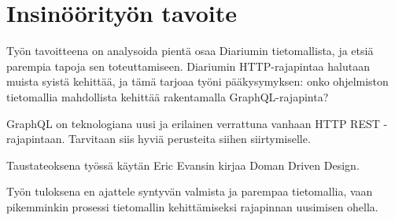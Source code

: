 \section{Insinöörityön tavoite}

Työn tavoitteena on analysoida pientä osaa Diariumin tietomallista, ja etsiä
parempia tapoja sen toteuttamiseen. Diariumin HTTP-rajapintaa halutaan muista
syistä kehittää, ja tämä tarjoaa työni pääkysymyksen: onko ohjelmiston
tietomallia mahdollista kehittää rakentamalla GraphQL-rajapinta?

GraphQL on teknologiana uusi ja erilainen verrattuna vanhaan HTTP REST
-rajapintaan. Tarvitaan siis hyviä perusteita siihen siirtymiselle.

Taustateoksena työssä käytän Eric Evansin kirjaa Doman Driven Design.

Työn tuloksena en ajattele syntyvän valmista ja parempaa tietomallia, vaan
pikemminkin prosessi tietomallin kehittämiseksi rajapinnan uusimisen ohella.